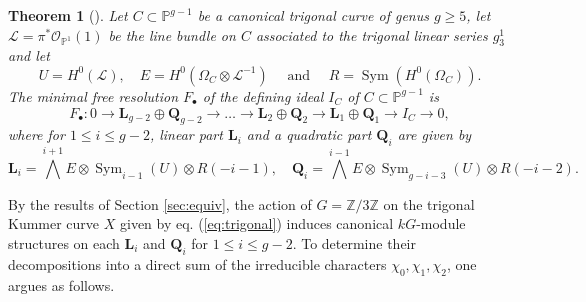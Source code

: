 \documentclass[10pt]{amsart}
\newtheorem{theorem}{Theorem}[subsection]
\theoremstyle{definition}
\newcommand{\cO}{\mathcal{O}}
\begin{document}
\begin{theorem}[{\cite[Cor.~4.4 and \S 6.1]{MR849058}}]\label{Schreyer}
Let $C \subset \mathbb{P}^{g-1}$ be a canonical trigonal curve of genus $g \ge 5$, let $\mathcal{L}= \pi^* \cO_{\mathbb{P}^1}(1)$ be the line bundle on $C$ associated to the trigonal linear series $g_3^1$ and let
\[
U = H^0(\mathcal{L}),\quad E = H^0(\Omega_C \otimes \mathcal{L}^{-1})\quad \text{ and }\quad R = \operatorname{Sym}(H^0( \Omega_C)).
\]
The minimal free resolution $F_\bullet$ of the defining ideal $I_C$ of $C \subset \mathbb{P}^{g-1}$ is
\[
F_\bullet:0 \longrightarrow \mathbf{L}_{g-2} \oplus \mathbf{Q}_{g-2} \longrightarrow \dots \longrightarrow  \mathbf{L}_2 \oplus \mathbf{Q}_2 \longrightarrow  \mathbf{L}_1 \oplus \mathbf{Q}_1 \longrightarrow I_C \longrightarrow 0,
\]
where for $1\leq i \leq g-2$, linear part $\mathbf{L}_i$ and a quadratic part $\mathbf{Q}_i$ are given by
\[
\mathbf{L}_i= \bigwedge^{i+1} E \otimes \operatorname{Sym}_{i-1}( U) \otimes R(-i-1),\quad
\mathbf{Q}_i= \bigwedge^{i-1} E \otimes \operatorname{Sym}_{g-i-3}( U) \otimes R(-i-2).
\]
\end{theorem}
By the results of Section \ref{sec:equiv}, the action of $G=\mathbb{Z}/3\mathbb{Z}$ on the trigonal Kummer curve $X$ given by eq. (\ref{eq:trigonal}) induces canonical $kG$-module structures on each $\mathbf{L}_i$ and $\mathbf{Q}_i$ for $1\leq i \leq g-2$. To determine their decompositions into a direct sum of the irreducible characters $\chi_0,\chi_1,\chi_2$, one argues as follows.\\
\end{document}
